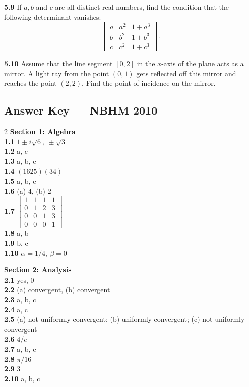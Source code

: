 \documentclass[11pt,a4paper]{article}
\newcommand{\examsec}[1]{%
  \subsection*{#1}
  \vspace{-2pt}
}
\newcommand{\qitem}[1]{\par\medskip\noindent\textbf{#1}\hspace{0.5em}}
\begin{document}
\qitem{5.9} If $a, b$ and $c$ are all distinct real numbers, find the condition that the following determinant vanishes:
\[
  \begin{vmatrix}
    a & a^2 & 1 + a^3 \\
    b & b^2 & 1 + b^3 \\
    c & c^2 & 1 + c^3
  \end{vmatrix}.
\]

\qitem{5.10} Assume that the line segment $[0, 2]$ in the $x$-axis of the plane acts as a mirror. A light ray from the point $(0, 1)$ gets reflected off this mirror and reaches the point $(2, 2)$. Find the point of incidence on the mirror.

\examsec{Answer Key --- NBHM 2010}
\begin{multicols}{2}
\textbf{Section 1: Algebra}\\
\textbf{1.1} $1 \pm i\sqrt{6},\ \pm\sqrt{3}$\\
\textbf{1.2} a, c\\
\textbf{1.3} a, b, c\\
\textbf{1.4} $(1625)(34)$\\
\textbf{1.5} a, b, c\\
\textbf{1.6} (a) $4$, (b) $2$\\
\textbf{1.7} $\begin{bmatrix} 1 & 1 & 1 & 1 \\ 0 & 1 & 2 & 3 \\ 0 & 0 & 1 & 3 \\ 0 & 0 & 0 & 1 \end{bmatrix}$\\
\textbf{1.8} a, b\\
\textbf{1.9} b, c\\
\textbf{1.10} $\alpha = 1/4,\ \beta = 0$

\medskip
\textbf{Section 2: Analysis}\\
\textbf{2.1} yes, $0$\\
\textbf{2.2} (a) convergent, (b) convergent\\
\textbf{2.3} a, b, c\\
\textbf{2.4} a, c\\
\textbf{2.5} (a) not uniformly convergent; (b) uniformly convergent; (c) not uniformly convergent\\
\textbf{2.6} $4/e$\\
\textbf{2.7} a, b, c\\
\textbf{2.8} $\pi/16$\\
\textbf{2.9} $3$\\
\textbf{2.10} a, b, c


\end{multicols}
\end{document}

